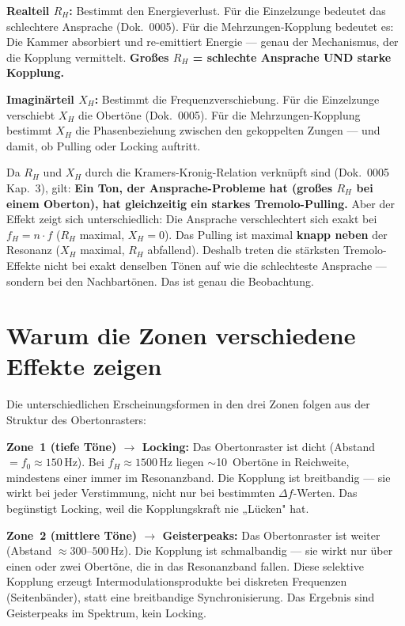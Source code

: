\documentclass[11pt,a4paper]{article}
\begin{document}
\textbf{Realteil $R_H$:} Bestimmt den Energieverlust. Für die Einzelzunge bedeutet das schlechtere Ansprache (Dok.~0005). Für die Mehrzungen-Kopplung bedeutet es: Die Kammer absorbiert und re-emittiert Energie --- genau der Mechanismus, der die Kopplung vermittelt. \textbf{Großes $R_H$ = schlechte Ansprache UND starke Kopplung.}

\textbf{Imaginärteil $X_H$:} Bestimmt die Frequenzverschiebung. Für die Einzelzunge verschiebt $X_H$ die Obertöne (Dok.~0005). Für die Mehrzungen-Kopplung bestimmt $X_H$ die Phasenbeziehung zwischen den gekoppelten Zungen --- und damit, ob Pulling oder Locking auftritt.

Da $R_H$ und $X_H$ durch die Kramers-Kronig-Relation verknüpft sind (Dok.~0005 Kap.~3), gilt: \textbf{Ein Ton, der Ansprache-Probleme hat (großes $R_H$ bei einem Oberton), hat gleichzeitig ein starkes Tremolo-Pulling.} Aber der Effekt zeigt sich unterschiedlich: Die Ansprache verschlechtert sich exakt bei $f_H = n \cdot f$ ($R_H$ maximal, $X_H = 0$). Das Pulling ist maximal \textbf{knapp neben} der Resonanz ($X_H$ maximal, $R_H$ abfallend). Deshalb treten die stärksten Tremolo-Effekte nicht bei exakt denselben Tönen auf wie die schlechteste Ansprache --- sondern bei den Nachbartönen. Das ist genau die Beobachtung.

\section{Warum die Zonen verschiedene Effekte zeigen}

Die unterschiedlichen Erscheinungsformen in den drei Zonen folgen aus der Struktur des Obertonrasters:

\textbf{Zone~1 (tiefe Töne) $\to$ Locking:} Das Obertonraster ist dicht (Abstand $= f_0 \approx 150$\,Hz). Bei $f_H \approx 1500$\,Hz liegen $\sim$10~Obertöne in Reichweite, mindestens einer immer im Resonanzband. Die Kopplung ist breitbandig --- sie wirkt bei jeder Verstimmung, nicht nur bei bestimmten $\Delta f$-Werten. Das begünstigt Locking, weil die Kopplungskraft nie „Lücken" hat.

\textbf{Zone~2 (mittlere Töne) $\to$ Geisterpeaks:} Das Obertonraster ist weiter (Abstand $\approx 300$--$500$\,Hz). Die Kopplung ist schmalbandig --- sie wirkt nur über einen oder zwei Obertöne, die in das Resonanzband fallen. Diese selektive Kopplung erzeugt Intermodulationsprodukte bei diskreten Frequenzen (Seitenbänder), statt eine breitbandige Synchronisierung. Das Ergebnis sind Geisterpeaks im Spektrum, kein Locking.
\end{document}
